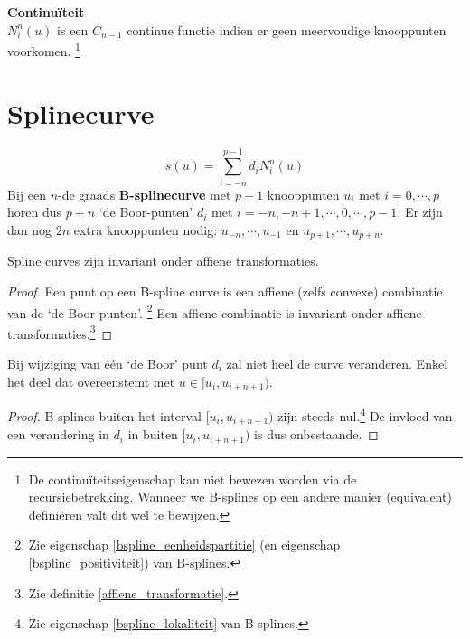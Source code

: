\documentclass[computergesteund_ontwerp_van_curven_en_oppervlakken.tex]{subfiles}
\begin{document}
\begin{ei}
\textbf{Continu\"iteit}\\
$N_{i}^{n}(u)$ is een $C_{n-1}$ continue functie indien er geen meervoudige knooppunten voorkomen. \footnote{De continu\"iteitseigenschap kan niet bewezen worden via de recursiebetrekking. Wanneer we B-splines op een andere manier (equivalent) defini\"eren valt dit wel te bewijzen.}
\end{ei}

\section{Splinecurve}
\begin{de}
\[
s(u) = \sum_{i=-n}^{p-1}d_iN_{i}^{n}(u)
\]
Bij een $n$-de graads \textbf{B-splinecurve} met $p+1$ knooppunten $u_i$ met $i = 0,\cdots ,p$ horen dus $p+n$ `de Boor-punten' $d_i$ met $i = -n, -n+1, \cdots, 0, \cdots , p-1$. Er zijn dan nog $2n$ extra knooppunten nodig: $u_{-n},\cdots,u_{-1}$ en $u_{p+1},\cdots,u_{p+n}$.
\end{de}


\begin{ei}
Spline curves zijn invariant onder affiene transformaties.
\begin{proof}
Een punt op een B-spline curve is een affiene (zelfs convexe) combinatie van de `de Boor-punten'. \footnote{Zie eigenschap \ref{bspline_eenheidspartitie} (en eigenschap \ref{bspline_positiviteit}) van B-splines.}
Een affiene combinatie is invariant onder affiene transformaties.\footnote{Zie definitie \ref{affiene_transformatie}.}
\end{proof}
\end{ei}

\begin{ei}
Bij wijziging van \'e\'en `de Boor' punt $d_i$ zal niet heel de curve veranderen. Enkel het deel dat overeenstemt met $u \in [u_i,u_{i+n+1})$.
\begin{proof}
B-splines buiten het interval $[u_i,u_{i+n+1})$ zijn steeds nul.\footnote{Zie eigenschap \ref{bspline_lokaliteit} van B-splines.}
De invloed van een verandering in $d_i$ in buiten $[u_i,u_{i+n+1})$ is dus onbestaande.
\end{proof}
\end{ei}
\end{document}

